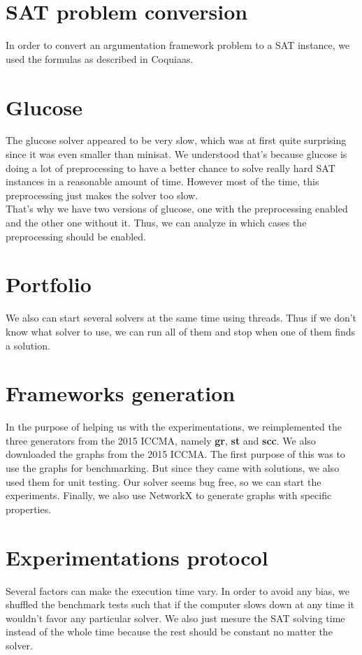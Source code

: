 \documentclass[11pt]{article}
\begin{document}
\section{SAT problem conversion}
In order to convert an argumentation framework problem to a SAT instance, we used the formulas as described in Coquiaas.\cite{lagniez2015coquiaas}

\section{Glucose}
The glucose solver appeared to be very slow, which was at first quite surprising since it was even smaller than minisat. We understood that's because glucose is doing a lot of preprocessing to have a better chance to solve really hard SAT instances in a reasonable amount of time. However most of the time, this preprocessing just makes the solver too slow. \\
That's why we have two versions of glucose, one with the preprocessing enabled and the other one without it. Thus, we can analyze in which cases the preprocessing should be enabled.

\section{Portfolio}
We also can start several solvers at the same time using threads. Thus if we don't know what solver to use, we can run all of them and stop when one of them finds a solution.

\section{Frameworks generation}
In the purpose of helping us with the experimentations, we reimplemented the three generators from the 2015 ICCMA\cite{arg2017Generator}, namely \textbf{gr}, \textbf{st} and \textbf{scc}. We also downloaded the graphs from the 2015 ICCMA. The first purpose of this was to use the graphs for benchmarking. But since they came with solutions, we also used them for unit testing. Our solver seems bug free, so we can start the experiments. Finally, we also use NetworkX to generate graphs with specific properties.

\section{Experimentations protocol}
Several factors can make the execution time vary. In order to avoid any bias, we shuffled the benchmark tests such that if the computer slows down at any time it wouldn't favor any particular solver. We also just mesure the SAT solving time instead of the whole time because the rest should be constant no matter the solver.
\end{document}
